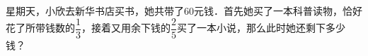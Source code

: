 星期天，小欣去新华书店买书，她共带了60元钱．首先她买了一本科普读物，恰好花了所带钱数的$\dfrac{1}{3}$，接着又用余下钱的$\dfrac{2}{5}$买了一本小说，那么此时她还剩下多少钱？